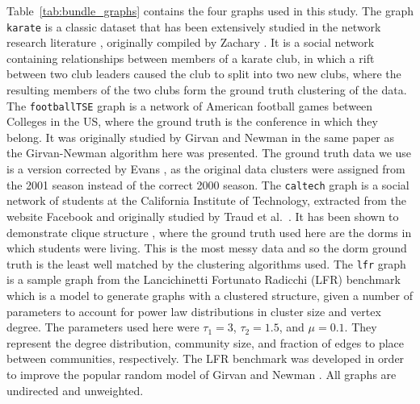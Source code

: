 Table~\ref{tab:bundle_graphs} contains the four graphs used in this study.
The graph \texttt{karate} is a classic dataset that has been extensively studied in the network research literature \cite{Fortunato2016}, originally compiled by Zachary \cite{Zachary1977}. It is a social network containing relationships between members of a karate club, in which a rift between two club leaders caused the club to split into two new clubs, where the resulting members of the two clubs form the ground truth clustering of the data.
The \texttt{footballTSE} graph is a network of American football games between Colleges in the US, where the ground truth is the conference in which they belong. It was originally studied by Girvan and Newman \cite{Girvan2002} in the same paper as the Girvan-Newman algorithm here was presented. The ground truth data we use is a version corrected by Evans \cite{Evans2010}, as the original data clusters were assigned from the 2001 season instead of the correct 2000 season. 
The \texttt{caltech} graph is a social network of students at the California Institute of Technology, extracted from the website Facebook and originally studied by Traud et al.\ \cite{Traud2012}. It has been shown to demonstrate clique structure \cite{Nocaj2015}, where the ground truth used here are the dorms in which students were living. This is the most messy data and so the dorm ground truth is the least well matched by the clustering algorithms used.
The \texttt{lfr} graph is a sample graph from the Lancichinetti Fortunato Radicchi (LFR) benchmark \cite{Lancichinetti2008} which is a model to generate graphs with a clustered structure, given a number of parameters to account for power law distributions in cluster size and vertex degree. The parameters used here were $\tau_1=3$, $\tau_2=1.5$, and $\mu=0.1$. They represent the degree distribution, community size, and fraction of edges to place between communities, respectively. The LFR benchmark was developed in order to improve the popular random model of Girvan and Newman \cite{Girvan2002}.
All graphs are undirected and unweighted.

